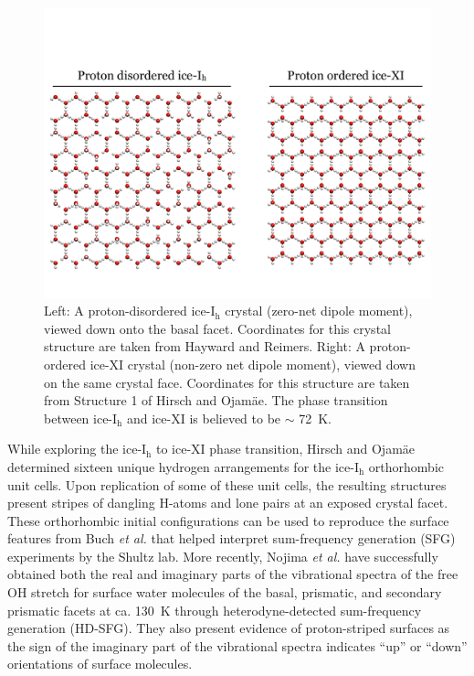 \begin{figure} 
\includegraphics[width=\linewidth]{Figures/iceTransition}
\caption{\label{fig:iceTransition}Left: A proton-disordered
  ice-I$_\mathrm{h}$ crystal (zero-net dipole moment), viewed down
  onto the basal facet. Coordinates for this crystal structure are
  taken from Hayward and Reimers.\cite{Hayward1997} Right: A
  proton-ordered ice-XI crystal (non-zero net dipole moment), viewed
  down on the same crystal face. Coordinates for this structure are
  taken from Structure 1 of Hirsch and Ojam\"{a}e.\cite{Hirsch2004}
  The phase transition between ice-I$_\mathrm{h}$ and ice-XI is
  believed to be $\sim$ 72~K.}
\end{figure}

While exploring the ice-I$_\mathrm{h}$ to ice-XI phase transition, Hirsch
and Ojam\"{a}e determined sixteen unique hydrogen arrangements for the
ice-I$_\mathrm{h}$ orthorhombic unit cells.\cite{Hirsch2004} Upon
replication of some of these unit cells, the resulting structures
present stripes of dangling H-atoms and lone pairs at an exposed
crystal facet. These orthorhombic initial configurations can be used
to reproduce the surface features from Buch \textit{et
  al.}\cite{Buch2008} that helped interpret sum-frequency generation
(SFG) experiments by the Shultz lab.\cite{Groenzin2007} More recently,
Nojima \textit{et al.}\cite{Nojima2017} have successfully obtained
both the real and imaginary parts of the vibrational spectra of the
free OH stretch for surface water molecules of the basal, prismatic,
and secondary prismatic facets at ca. 130~K through
heterodyne-detected sum-frequency generation (HD-SFG). They also
present evidence of proton-striped surfaces as the sign of the
imaginary part of the vibrational spectra indicates ``up'' or ``down''
orientations of surface molecules.

